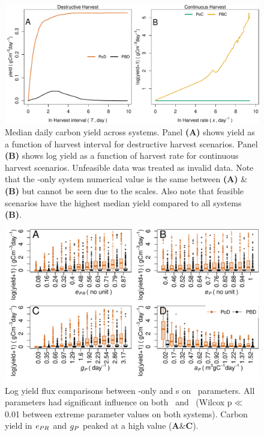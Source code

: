 \documentclass[env.tex]{subfiles}
\begin{document}
\begin{figure}[H]
    \centering
    \includegraphics[width=\linewidth]{result/DailyYield.pdf}
    \caption[Median daily carbon yield across systems]{Median daily carbon yield across systems.  Panel \textbf{(A)} shows yield as a function of harvest interval for destructive harvest scenarios.  Panel \textbf{(B)} shows log yield as a function of harvest rate for continuous harvest scenarios.  Unfeasible data was treated as invalid data.  Note that the \phy-only system numerical value is the same between \textbf{(A)} \& \textbf{(B)} but cannot be seen due to the scales.  Also note that feasible scenarios have the highest median yield compared to all systems \textbf{(B)}.\lnExplain}
    \label{f:ydDaily}
\end{figure}

\begin{figure}[H]
    \centering
    \includegraphics[width=\linewidth]{result/bacEff1.pdf}
    \caption[Log yield flux comparisons between feasible \phy-only and \pbs s]{Log yield flux comparisons between \phy-only and \pbs s on \phy\ parameters.  All parameters had significant influence on both \PoN\ and \PBN\ (Wilcox p$\ll$0.01 between extreme parameter values on both systems).  Carbon yield in $e_{PR}$ and $g_P$ peaked at a high value (\textbf{A}\&\textbf{C}).\lnExplain}
    \label{f:bacEffect}
\end{figure}
\end{document}
